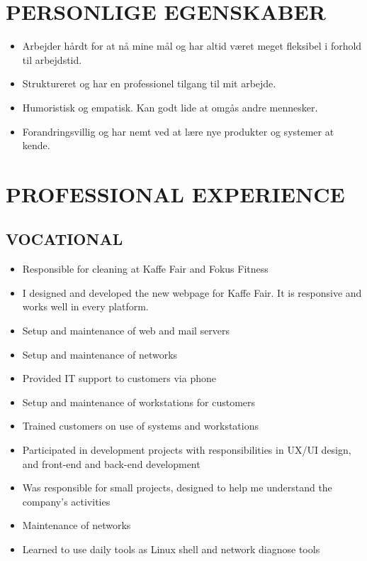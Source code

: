 \documentclass[11pt,a4paper,sans]{moderncv}        %
\begin{document}
\section{PERSONLIGE EGENSKABER}
\begin{itemize}
\item Arbejder hårdt for at nå mine mål og har altid været meget fleksibel i forhold til arbejdstid.
\item Struktureret og har en professionel tilgang til mit arbejde.
\item Humoristisk og empatisk. Kan godt lide at omgås andre mennesker.
\item Forandringsvillig og har nemt ved at lære nye produkter og systemer at kende.
\end{itemize}
\fi

\ifenglish
\section{PROFESSIONAL EXPERIENCE}
\subsection{VOCATIONAL}
\begin{itemize}
\item Responsible for cleaning at Kaffe Fair and Fokus Fitness
\end{itemize}
\bigskip
{}
\begin{itemize}
\item I designed and developed the new webpage for Kaffe Fair. It is responsive and works well in every platform.
\end{itemize}
\bigskip
{}
\begin{itemize}
\item Setup and maintenance of web and mail servers
\item Setup and maintenance of networks
\item Provided IT support to customers via phone
\item Setup and maintenance of workstations for customers
\item Trained customers on use of systems and workstations
\item Participated in development projects with responsibilities in UX/UI design, and front-end and back-end development
\end{itemize}
\bigskip
{}
\begin{itemize}
\item Was responsible for small projects, designed to help me understand the company's activities
\item Maintenance of networks
\item Learned to use daily tools as Linux shell and network diagnose tools
\end{itemize}
\bigskip
\end{document}
